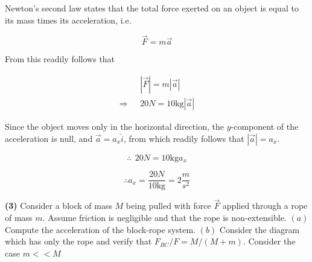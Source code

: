\documentclass[12pt]{article}
\theoremstyle{definition}
\begin{document}
Newton's second law states that the total force exerted on an object is equal to
its mass times its acceleration, i.e. 

\begin{equation*}
    \vec{F} = m \vec{a}
\end{equation*}

From this readily follows that 

\begin{align*}
    &\left| \vec{F} \right| = m \left| \vec{a} \right|  \\ 
    \Rightarrow ~ ~ ~ &20N = 10\text{kg} \left| \vec{a} \right| 
\end{align*}

Since the object moves only in the horizontal direction, the $y$-component of
the acceleration is null, and $\vec{a} = a_x \hat{i}$, from which readily follows
that $\left| \vec{a} \right| = a_x $.

\begin{equation*}
    \therefore ~ ~ 20N = 10\text{kg} a_x
\end{equation*}

\begin{equation*}
    \therefore a_x = \frac{20N}{10\text{kg}} = 2\frac{m}{s^2}
\end{equation*}

\pagebreak 

\begin{shaded}
    \textbf{(3)} Consider a block of mass $M$ being pulled with force $\vec{F}$
    applied through a rope of mass $m$. Assume friction is negligible and that
    the rope is non-extensible. $(a)$ Compute the acceleration of the block-rope
    system. $(b)$ Consider the diagram which has only the rope and verify that 
    $F_{BC}/F = M / (M+m)$. Consider the case $m < <  M$

\end{shaded}
\end{document}
